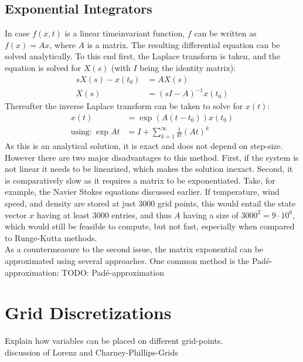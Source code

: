 \subsection{Exponential Integrators}
In case $f(x,t)$ is a linear timeinvariant function, $f$ can be written as $f(x)=Ax$, where $A$ is a matrix.
The resulting differential equation can be solved analytically.
To this end first, the Laplace transform is taken, and the equation is solved for $X(s)$ (with $I$ being the identity matrix):
\begin{align*}
sX(s) - x(t_0) &= AX(s)\\
X(s) &= (sI-A)^{-1}x(t_0)
\end{align*}
Thereafter the inverse Laplace transform can be taken to solve for $x(t)$:
\begin{align*}
x(t) &= \exp (A (t-t_0))x(t_0)\\
\text{using:}~ \exp{At} &= I + \sum_{k=1}^{\infty}\frac{1}{k!}(At)^k
\end{align*}
As this is an analytical solution, it is exact and does not depend on step-size.
However there are two major disadvantages to this method.
First, if the system is not linear it needs to be linearized, which makes the solution inexact.
Second, it is comparatively slow as it requires a matrix to be exponentiated.
Take, for example, the Navier Stokes equations discussed earlier.
If temperature, wind speed, and density are stored at just 3000 grid points, this would entail the state vector $x$ having at least 3000 entries, and thus $A$ having a size of $3000^2=9\cdot 10^6$, which would still be feasible to compute, but not fast, especially when compared to Runge-Kutta methods.\\
As a countermeasure to the second issue, the matrix exponential can be approximated using several approaches.
One common method is the Padé-approximation:
TODO: Padé-approximation


\section{Grid Discretizations}
Explain how variables can be placed on different grid-points.\\
discussion of Lorenz and Charney-Phillips-Grids